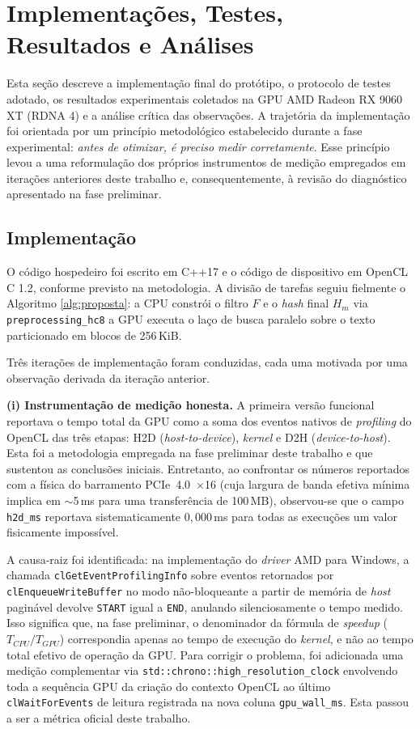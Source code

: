 \documentclass[12pt]{article}
\begin{document}
\section{Implementações, Testes, Resultados e Análises}
\label{sec:resultados}

Esta seção descreve a implementação final do protótipo, o protocolo de testes adotado, os resultados experimentais coletados na GPU AMD Radeon RX 9060 XT (RDNA 4) e a análise crítica das observações. A trajetória da implementação foi orientada por um princípio metodológico estabelecido durante a fase experimental: \textit{antes de otimizar, é preciso medir corretamente}. Esse princípio levou a uma reformulação dos próprios instrumentos de medição empregados em iterações anteriores deste trabalho e, consequentemente, à revisão do diagnóstico apresentado na fase preliminar.

\subsection{Implementação}
\label{sec:impl}

O código hospedeiro foi escrito em C++17 e o código de dispositivo em OpenCL C 1.2, conforme previsto na metodologia. A divisão de tarefas seguiu fielmente o Algoritmo \ref{alg:proposta}: a CPU constrói o filtro $F$ e o \textit{hash} final $H_m$ via \texttt{preprocessing\_hc8} a GPU executa o laço de busca paralelo sobre o texto particionado em blocos de 256\,KiB.

Três iterações de implementação foram conduzidas, cada uma motivada por uma observação derivada da iteração anterior.

\textbf{(i) Instrumentação de medição honesta.} A primeira versão funcional reportava o tempo total da GPU como a soma dos eventos nativos de \textit{profiling} do OpenCL das três etapas: H2D (\textit{host-to-device}), \textit{kernel} e D2H (\textit{device-to-host}). Esta foi a metodologia empregada na fase preliminar deste trabalho e que sustentou as conclusões iniciais. Entretanto, ao confrontar os números reportados com a física do barramento PCIe~4.0~$\times$16 (cuja largura de banda efetiva mínima implica em $\sim$5\,ms para uma transferência de 100\,MB), observou-se que o campo \texttt{h2d\_ms} reportava sistematicamente $0{,}000$\,ms para todas as execuções  um valor fisicamente impossível.

A causa-raiz foi identificada: na implementação do \textit{driver} AMD para Windows, a chamada \texttt{clGetEventProfilingInfo} sobre eventos retornados por \texttt{clEnqueueWriteBuffer} no modo não-bloqueante a partir de memória de \textit{host} paginável devolve \texttt{START} igual a \texttt{END}, anulando silenciosamente o tempo medido. Isso significa que, na fase preliminar, o denominador da fórmula de \textit{speedup} ($T_{CPU}/T_{GPU}$) correspondia apenas ao tempo de execução do \textit{kernel}, e não ao tempo total efetivo de operação da GPU. Para corrigir o problema, foi adicionada uma medição complementar via \texttt{std::chrono::high\_resolution\_clock} envolvendo toda a sequência GPU  da criação do contexto OpenCL ao último \texttt{clWaitForEvents} de leitura  registrada na nova coluna \texttt{gpu\_wall\_ms}. Esta passou a ser a métrica oficial deste trabalho.
\end{document}
